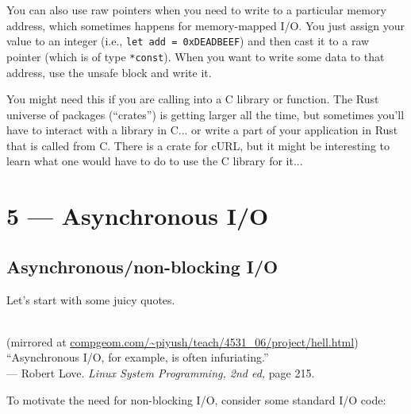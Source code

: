 \documentclass[a4paper]{report}
\begin{document}
You can also use raw pointers when you need to write to a particular memory address, which sometimes happens for memory-mapped I/O. You just assign your value to an integer (i.e., \texttt{let add = 0xDEADBEEF}) and then cast it to a raw pointer (which is of type \texttt{*const}). When you want to write some data to that address, use the unsafe block and write it.

You might need this if you are calling into a C library or function. The Rust universe of packages (``crates'') is getting larger all the time, but sometimes you'll have to interact with a library in C... or write a part of your application in Rust that is called from C. There is a crate for cURL, but it might be interesting to learn what one would have to do to use the C library for it...








\chapter*{5 --- Asynchronous I/O}


\section*{Asynchronous/non-blocking I/O}

Let's start with some juicy quotes.

\begin{center}
  \\
{\scriptsize (mirrored at \url{compgeom.com/~piyush/teach/4531_06/project/hell.html})}
   \\[2em]

   ``Asynchronous I/O, for example, is often infuriating.''\\
\hfill --- Robert Love. {\em Linux System Programming, 2nd ed, } page 215.

\end{center}

To motivate the need for non-blocking I/O, consider some standard I/O code:
\end{document}
